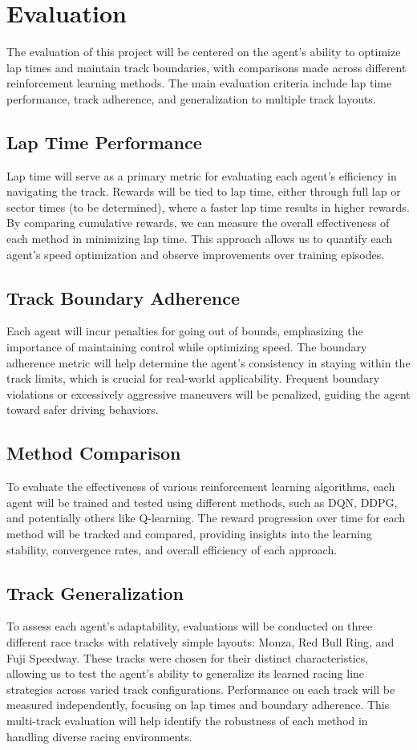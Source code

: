 \documentclass{article}
\begin{document}
\section{Evaluation}

The evaluation of this project will be centered on the agent’s ability to optimize lap times and maintain track boundaries, with comparisons made across different reinforcement learning methods. The main evaluation criteria include lap time performance, track adherence, and generalization to multiple track layouts.

\subsection{Lap Time Performance}
Lap time will serve as a primary metric for evaluating each agent’s efficiency in navigating the track. Rewards will be tied to lap time, either through full lap or sector times (to be determined), where a faster lap time results in higher rewards. By comparing cumulative rewards, we can measure the overall effectiveness of each method in minimizing lap time. This approach allows us to quantify each agent’s speed optimization and observe improvements over training episodes.

\subsection{Track Boundary Adherence}
Each agent will incur penalties for going out of bounds, emphasizing the importance of maintaining control while optimizing speed. The boundary adherence metric will help determine the agent’s consistency in staying within the track limits, which is crucial for real-world applicability. Frequent boundary violations or excessively aggressive maneuvers will be penalized, guiding the agent toward safer driving behaviors.

\subsection{Method Comparison}
To evaluate the effectiveness of various reinforcement learning algorithms, each agent will be trained and tested using different methods, such as DQN, DDPG, and potentially others like Q-learning. The reward progression over time for each method will be tracked and compared, providing insights into the learning stability, convergence rates, and overall efficiency of each approach.

\subsection{Track Generalization}
To assess each agent’s adaptability, evaluations will be conducted on three different race tracks with relatively simple layouts: Monza, Red Bull Ring, and Fuji Speedway. These tracks were chosen for their distinct characteristics, allowing us to test the agent’s ability to generalize its learned racing line strategies across varied track configurations. Performance on each track will be measured independently, focusing on lap times and boundary adherence. This multi-track evaluation will help identify the robustness of each method in handling diverse racing environments.
\end{document}
